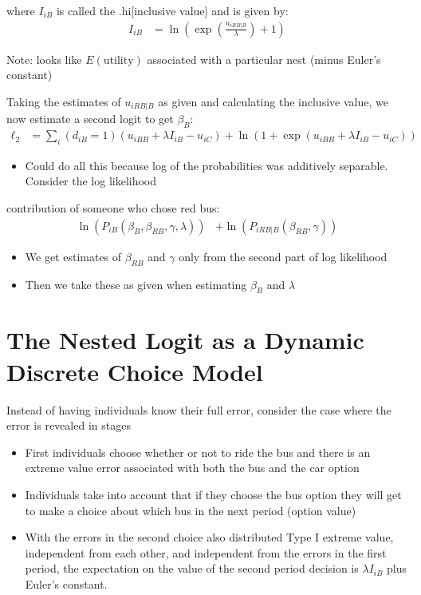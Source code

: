 \documentclass[11pt]{article}
\begin{document}
where \(I_{iB}\) is called the .hi[inclusive value] and is given by:
\begin{align*}
I_{iB}&=\ln\left(\exp\left(\frac{u_{iRB|B}}{\lambda}\right)+1\right)
\end{align*}

Note: looks like \(E\left(\text{utility}\right)\) associated with a particular nest (minus Euler's constant)


Taking the estimates of \(u_{iRB|B}\) as given and calculating the inclusive value, we now estimate a second logit to get \(\beta_B\):
\begin{align*}
\ell_2&=\sum_i(d_{iB}=1)(u_{iBB}+\lambda I_{iB}-u_{iC})+\ln(1+\exp(u_{iBB}+\lambda I_{iB}-u_{iC}))
\end{align*}

\begin{itemize}
\item Could do all this because log of the probabilities was additively separable. Consider the log likelihood
\end{itemize}
contribution of someone who chose red bus:
\begin{align*}
\ln(P_{iB}(\beta_{B},\beta_{RB},\gamma,\lambda))&+\ln(P_{iRB|B}(\beta_{RB},\gamma))
\end{align*}

\begin{itemize}
\item We get estimates of \(\beta_{RB}\) and \(\gamma\) only from the second part of log likelihood

\item Then we take these as given when estimating \(\beta_{B}\) and \(\lambda\)
\end{itemize}


\section{The Nested Logit as a Dynamic Discrete Choice Model}
\label{sec:org4d4c9fa}

Instead of having individuals know their full error, consider the case where the error is revealed in stages

\begin{itemize}
\item First individuals choose whether or not to ride the bus and there is an extreme value error associated with both the bus and the car option
\item Individuals take into account that if they choose the bus option they will get to make a choice about which bus in the next period (option value)
\item With the errors in the second choice also distributed Type I extreme value, independent from each other, and independent from the errors in the first period, the expectation on the value of the second period decision is \(\lambda I_{iB}\) plus Euler's constant.
\end{itemize}
\end{document}
